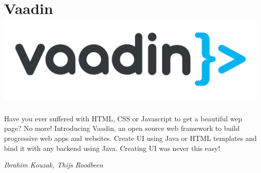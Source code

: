 \section*{Vaadin\hfill\includegraphics[width=.35\linewidth]{images/Vaadin.png}}

Have you ever suffered with HTML, CSS or Javascript to get a beautiful wep page? No more! Introducing Vaadin, an open source web framework to build progressive web apps and websites. Create UI using Java or HTML templates and bind it with any backend using Java. Creating UI was never this easy!

\hfill\textit{Ibrahim Kouzak, Thijs Roodbeen}